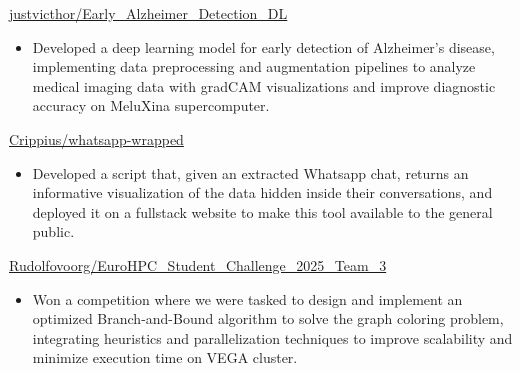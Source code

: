 



         {}
        {
        }
        {\href{https://github.com/justvicthor/Early_Alzheimer_Detection_DL}
        {justvicthor/Early\_Alzheimer\_Detection\_DL}}
        \begin{itemize}
     
        \item Developed a deep learning model for early detection of Alzheimer's disease, implementing data preprocessing and augmentation pipelines to analyze medical imaging data with gradCAM visualizations and improve diagnostic accuracy on MeluXina supercomputer.
        
    
        \end{itemize}
        
        \medskip

          {}
         {
         }
         {\href{https://github.com/Crippius/whatsapp-wrapped}
         {Crippius/whatsapp-wrapped}}
         \begin{itemize}
              
             \item Developed a script that, given an extracted Whatsapp chat, returns an informative visualization of the data hidden inside their conversations, and deployed it on a fullstack website to make this tool available to the general public.
        
        \end{itemize}

        \medskip



          {}
         {
         }
         {\href{https://github.com/Rudolfovoorg/EuroHPC_Student_Challenge_2025_Team_3}{Rudolfovoorg/EuroHPC\_Student\_Challenge\_2025\_Team\_3}}
         \begin{itemize}
              
             \item Won a competition where we were tasked to design and implement an optimized Branch-and-Bound algorithm to solve the graph coloring problem, integrating heuristics and parallelization techniques to improve scalability and minimize execution time on VEGA cluster. 
             
        \end{itemize}


